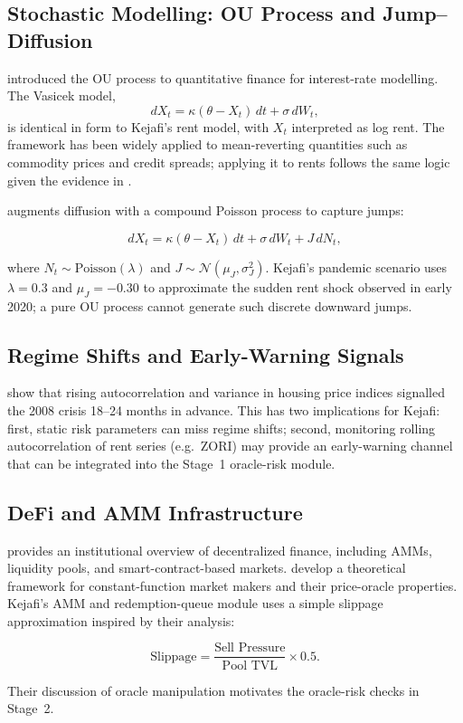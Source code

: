 \documentclass[11pt,letterpaper]{article}
\begin{document}
\subsection{Stochastic Modelling: OU Process and Jump--Diffusion}

\citet{vasicek1977} introduced the OU process to quantitative finance for interest-rate
modelling. The Vasicek model,
\[
dX_t = \kappa(\theta - X_t)\,dt + \sigma\,dW_t,
\]
is identical in form to Kejafi's rent model, with $X_t$ interpreted as log rent. The
framework has been widely applied to mean-reverting quantities such as commodity prices and
credit spreads; applying it to rents follows the same logic given the evidence in
\citet{case1989}.

\citet{merton1976} augments diffusion with a compound Poisson process to capture jumps:
\begin{eqbox}
\begin{equation}
dX_t = \kappa(\theta - X_t)\,dt + \sigma\,dW_t + J\,dN_t,
\label{eq:jump_diffusion}
\end{equation}
\end{eqbox}
where $N_t \sim \text{Poisson}(\lambda)$ and $J \sim \mathcal{N}(\mu_J,\sigma_J^2)$.
Kejafi's pandemic scenario uses $\lambda = 0.3$ and $\mu_J = -0.30$ to approximate the
sudden rent shock observed in early 2020; a pure OU process cannot generate such discrete
downward jumps.

\subsection{Regime Shifts and Early-Warning Signals}

\citet{guttal2016} show that rising autocorrelation and variance in housing price indices
signalled the 2008 crisis 18--24 months in advance. This has two implications for Kejafi:
first, static risk parameters can miss regime shifts; second, monitoring rolling
autocorrelation of rent series (e.g.\ ZORI) may provide an early-warning channel that can
be integrated into the Stage~1 oracle-risk module.

\subsection{DeFi and AMM Infrastructure}

\citet{schar2021} provides an institutional overview of decentralized finance, including
AMMs, liquidity pools, and smart-contract-based markets. \citet{angeris2020} develop a
theoretical framework for constant-function market makers and their price-oracle
properties. Kejafi's AMM and redemption-queue module uses a simple slippage approximation
inspired by their analysis:
\begin{eqbox}
\begin{equation}
\text{Slippage} = \frac{\text{Sell Pressure}}{\text{Pool TVL}} \times 0.5.
\label{eq:amm_slip}
\end{equation}
\end{eqbox}
Their discussion of oracle manipulation motivates the oracle-risk checks in Stage~2.
\end{document}
